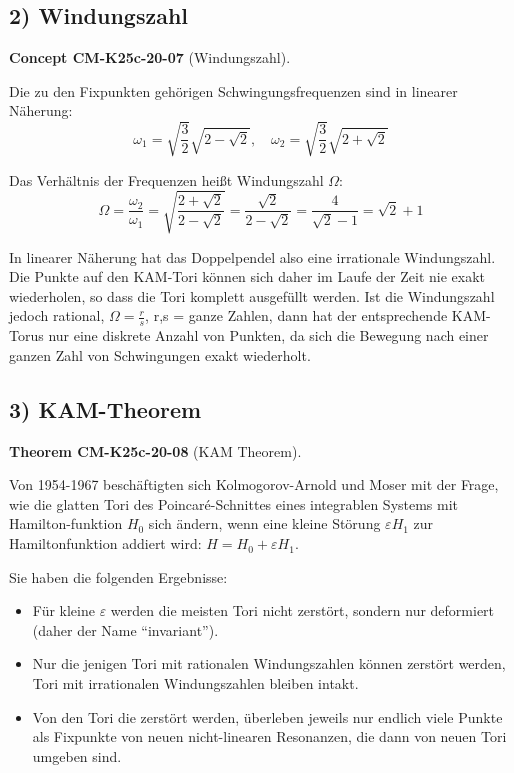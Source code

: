 \documentclass[10pt, letterpaper]{article}
\newcommand{\CustomHeading}[3]{%
  \par\medskip\noindent%
  \textbf{#1 #2} \textnormal{(#3)}.\enskip%
}
\newenvironment{THEO}[2]{\begin{unitbox}\CustomHeading{Theorem}{#1}{#2}}{\end{unitbox}}
\newenvironment{CONC}[2]{\begin{unitbox}\CustomHeading{Concept}{#1}{#2}}{\end{unitbox}}
\begin{document}
\subsection*{2) Windungszahl}

\begin{CONC}{CM-K25c-20-07}{Windungszahl}
Die zu den Fixpunkten gehörigen Schwingungsfrequenzen sind in linearer Näherung:
\[ \omega_1 = \sqrt{\frac{3}{2}}\sqrt{2-\sqrt{2}}, \quad \omega_2 = \sqrt{\frac{3}{2}}\sqrt{2+\sqrt{2}} \]

Das Verhältnis der Frequenzen heißt Windungszahl $\Omega$:
\[ \Omega = \frac{\omega_2}{\omega_1} = \sqrt{\frac{2+\sqrt{2}}{2-\sqrt{2}}} = \frac{\sqrt{2}}{2-\sqrt{2}} = \frac{4}{\sqrt{2}-1} = \sqrt{2}+1 \]

In linearer Näherung hat das Doppelpendel also eine irrationale Windungszahl. Die Punkte auf den KAM-Tori können sich daher im Laufe der Zeit nie exakt wiederholen, so dass die Tori komplett ausgefüllt werden. Ist die Windungszahl jedoch rational, $\Omega = \frac{r}{s}$, r,s = ganze Zahlen, dann hat der entsprechende KAM-Torus nur eine diskrete Anzahl von Punkten, da sich die Bewegung nach einer ganzen Zahl von Schwingungen exakt wiederholt.
\end{CONC}

\subsection*{3) KAM-Theorem}

\begin{THEO}{CM-K25c-20-08}{KAM Theorem}
Von 1954-1967 beschäftigten sich Kolmogorov-Arnold und Moser mit der Frage, wie die glatten Tori des Poincaré-Schnittes eines integrablen Systems mit Hamilton-funktion $H_0$ sich ändern, wenn eine kleine Störung $\varepsilon H_1$ zur
Hamiltonfunktion addiert wird: $H = H_0 + \varepsilon H_1$.

Sie haben die folgenden Ergebnisse:

\begin{itemize}
\item Für kleine $\varepsilon$ werden die meisten Tori nicht zerstört, sondern nur deformiert (daher der Name ``invariant'').
\item Nur die jenigen Tori mit rationalen Windungszahlen können zerstört werden, Tori mit irrationalen Windungszahlen bleiben intakt.
\item Von den Tori die zerstört werden, überleben jeweils nur endlich viele Punkte als Fixpunkte von neuen nicht-linearen Resonanzen, die dann von neuen Tori umgeben sind.
\end{itemize}
\end{THEO}
\end{document}
